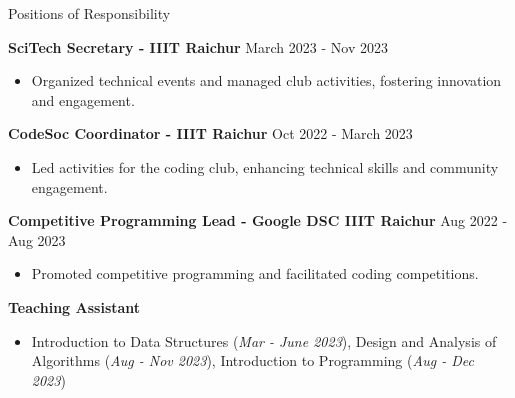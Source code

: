 \documentclass{resume}
\begin{document}
\begin{rSection}{Positions of Responsibility}

    \textbf{SciTech Secretary - IIIT Raichur} \hfill March 2023 - Nov 2023
    \begin{itemize}
        \itemsep -3pt {}
        \item Organized technical events and managed club activities, fostering innovation and engagement.
    \end{itemize}

    \textbf{CodeSoc Coordinator - IIIT Raichur} \hfill Oct 2022 - March 2023
    \begin{itemize}
        \itemsep -3pt {}
        \item Led activities for the coding club, enhancing technical skills and community engagement.
    \end{itemize}

    \textbf{Competitive Programming Lead - Google DSC IIIT Raichur} \hfill Aug 2022 - Aug 2023
    \begin{itemize}
        \itemsep -3pt {}
        \item Promoted competitive programming and facilitated coding competitions.
    \end{itemize}

    \textbf{Teaching Assistant}
    \begin{itemize}
        \itemsep -3pt {}
        \item Introduction to Data Structures (\textit{Mar - June 2023}), Design and Analysis of Algorithms (\textit{Aug - Nov 2023}), Introduction to Programming (\textit{Aug - Dec 2023})
    \end{itemize}

\end{rSection}
\end{document}
